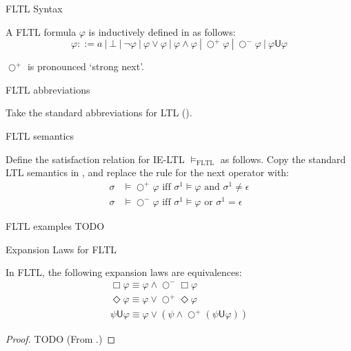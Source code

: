 \documentclass[a4paper]{article}
\newcommand{\U}{\mathsf{U}}
\newcommand{\tand}{\text{ and }}
\newcommand{\tor}{\text{ or }}
\newcommand{\tiff}{\text{ iff }}
\newcommand{\sn}{\bigcirc^+}
\newcommand{\wn}{\bigcirc^-}
\begin{document}
\begin{defn}{FLTL Syntax}

  A FLTL formula $\varphi$ is inductively defined in as follows:
  \[\varphi ::= a ~|~ \bot ~|~ \neg \varphi ~|~\varphi \lor \varphi ~|~ \varphi \land \varphi ~|~ \sn \varphi ~|~ \wn \varphi ~|~ \varphi \U\varphi\]

  $\sn$ is pronounced `strong next'.
\end{defn}

\begin{notn}{FLTL abbreviations}\label{fltlabbrev}

  Take the standard abbreviations for LTL ().%
\end{notn}

\begin{defn}{FLTL semantics}

  Define the satisfaction relation for IE-LTL $\vDash_{\text{FLTL}}$ as follows.
  Copy the standard LTL semantics in , and replace the rule for the next operator with:
  \begin{align*}
    \sigma&\vDash\sn\varphi \tiff \sigma^1\vDash\varphi \tand \sigma^1 \neq \epsilon\\
    \sigma&\vDash\wn\varphi \tiff \sigma^1\vDash\varphi \tor \sigma^1 = \epsilon
  \end{align*}
\end{defn}

\begin{eg}{FLTL examples}
  TODO
\end{eg}

\begin{lem}{Expansion Laws for FLTL}\label{fltlexp}

  In FLTL, the following expansion laws are equivalences:
  \begin{align}
    \Box \varphi \equiv \varphi \land \wn \Box \varphi \label{felBox}\\
    \Diamond \varphi \equiv \varphi \lor \sn \Diamond \varphi\label{felDiamond}\\
    \psi \U \varphi \equiv \varphi \lor (\psi \land \sn (\psi \U \varphi))\label{felU}
  \end{align}

\end{lem}

\begin{proof}
  TODO (From \autocite{bauer2010comparing}.)
\end{proof}
\end{document}
